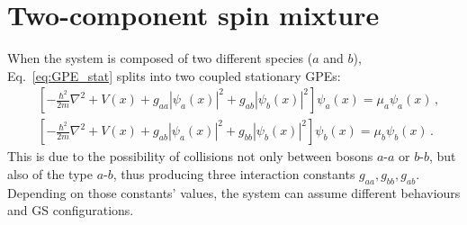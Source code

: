 \section{Two-component spin mixture}
When the system is composed of two different species ($a$ and $b$), Eq.\ \eqref{eq:GPE_stat} splits into two coupled stationary GPEs:
\begin{align*}
    &\left[ -\frac{\hbar^2}{2m}\nabla^2 + V(x) + g_{aa}|\psi_a(x)|^2 + g_{ab}|\psi_b(x)|^2
    \right] \psi_a(x) = \mu_a \psi_a(x)\, , \\
    &\left[ -\frac{\hbar^2}{2m}\nabla^2 + V(x) + g_{ab}|\psi_a(x)|^2 + g_{bb}|\psi_b(x)|^2
    \right] \psi_b(x) = \mu_b \psi_b(x)\, .
\end{align*}
This is due to the possibility of collisions not only between bosons $a$-$a$ or $b$-$b$, but also of the type $a$-$b$, thus producing three interaction constants $g_{aa}, g_{bb}, g_{ab}$. Depending on those constants' values, the system can assume different behaviours and GS configurations. 

